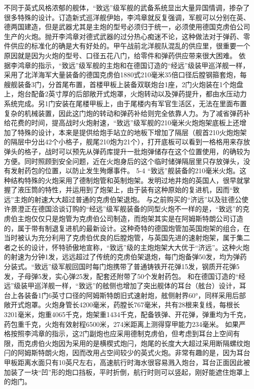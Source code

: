 \documentclass[12pt,UTF8]{ctexbook}
\begin{document}
不同于英式风格浓郁的舰体，“致远”级军舰的武备系统显出大量异国情调，掺杂了很多特殊的设计。订造新式巡洋舰伊始，李鸿章就反复强调，军舰可以分别在英、德两国建造，但是武器尤其是主炮的型号必须归于统一，必须使用德国克虏伯公司生产的火炮。抛开李鸿章对德式武器的过分热心痴迷不论，这种做法对于弹药、零件供应的标准化的确是大有好处的。甲午战前北洋舰队混乱的供应里，很重要一个原因就是因为火炮的型号、口径五花八门，给零件和弹药供应带来很大困难。
依据李鸿章的指示，“致远”级军舰的主炮和在德国订造的“经远”级装甲巡洋舰一样，采用了北洋海军大量装备的德国克虏伯1880式210毫米35倍口径后膛钢箍套炮，每艘舰装备3门，分首尾布置，首楼甲板上装备双联炮台1座，2门火炮装在1个炮盘上，炮台配备2英寸厚的后部敞开式炮罩，火炮转动以及弹药提升，都由水压动力系统完成。另1门安装在尾楼甲板上，由于尾楼内有军官生活区，无法在里面布置复杂的机械装置，因此这门炮的转动和弹药补给则完全依靠人力。为了减省弹药补给花费的时间，提高战时火炮射速，“致远”级军舰的210毫米火炮炮架底板上还增加了特殊的设计，本来是提供给炮手站立的地板下增加了隔层（舰首210火炮炮架的隔层中分出42个小格子，舰尾210炮为21个），打开底板可以看到一格格用来存放弹头的格子，战时可以预先从弹药库提升一批炮弹储存在这个位置使用，的确较为方便。同时照顾到安全问题，近在火炮身后的这个临时储弹隔层里只存放弹头，没有发射药包的位置，以防止发生殉爆事件。
5-4
“致远”舰装备的210毫米火炮。这种结构特殊的火炮采用了德制炮管和英制炮架。发明过地井炮的英国人，很早就掌握了液压筒的特性，并运用到了炮架上，由于装有这种原始的复进机，因而“致远”主炮的射速大大超过普通的克虏伯架退炮。
与之前购买的“济远”以及驻德公使许景澄正在德国洽谈订购的“经远”级军舰装备的同型火炮不一样的是，“致远”的克虏伯主炮仅仅只是炮管为克虏伯公司制造，而炮架其实是在阿姆斯特朗公司订造的，属于带有制退复进机的最新设计。这种奇特的德国炮管加英国炮架的组合，在当时被认为充分利用了克虏伯优良的后膛炮管，与英国先进的速射炮架，属于集二者之长的设计，怀特骄傲地宣称，“致远”级的主炮炮架大大优于“济远”。这种火炮的射速为分钟1发，远远超过了传统的克虏伯架退炮，每门炮备弹50发，均为弹药分装式。“致远”级军舰回国时每门炮携带了普通铸铁开花弹15发，钢质开花弹5发，子母弹5发，实心弹25发，配套还附带了50个发射药包。
和在德国订造的“经远”级装甲巡洋舰一样，“致远”的舷侧也增加了突出舰体的耳台（舷台）设计，耳台上各装备1门6英寸口径的阿姆斯特朗旧式速射炮，舷侧射界60°，同样采用后部敞开式炮罩。火炮身管长4200毫米，药膛长767毫米，共有28根来复线，每根长3201毫米，炮重4065千克，炮架重1434千克，配备铁弹、开花弹，弹重均为千克，药包重千克，火炮有效射程6500米，274米距离上测得穿甲能力234毫米。 如果严格按照李鸿章的指示，这2门副炮也应采用德制克虏伯，但考虑到耳台上空间有限，而克虏伯火炮因为采用的是横楔式炮闩，炮尾的长度大大超过采用断隔螺纹炮闩的阿姆斯特朗火炮，因而改用占空间较少的英式火炮。非常有趣的是，因为耳台甲板距离水面只有10英尺左右，高速航行时海水很容易溅入炮台，耳台正面因此被加装了一块“凹”形的炮口挡板，平时折倒，航行时则可以竖起，刚好能遮住炮罩上的炮门。
\end{document}
